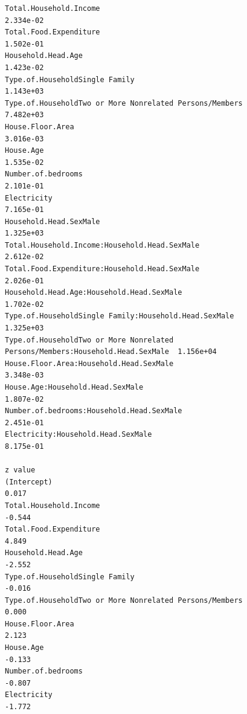 \documentclass[
]{article}
\begin{document}
\begin{verbatim}
Total.Household.Income                                                          2.334e-02
Total.Food.Expenditure                                                          1.502e-01
Household.Head.Age                                                              1.423e-02
Type.of.HouseholdSingle Family                                                  1.143e+03
Type.of.HouseholdTwo or More Nonrelated Persons/Members                         7.482e+03
House.Floor.Area                                                                3.016e-03
House.Age                                                                       1.535e-02
Number.of.bedrooms                                                              2.101e-01
Electricity                                                                     7.165e-01
Household.Head.SexMale                                                          1.325e+03
Total.Household.Income:Household.Head.SexMale                                   2.612e-02
Total.Food.Expenditure:Household.Head.SexMale                                   2.026e-01
Household.Head.Age:Household.Head.SexMale                                       1.702e-02
Type.of.HouseholdSingle Family:Household.Head.SexMale                           1.325e+03
Type.of.HouseholdTwo or More Nonrelated Persons/Members:Household.Head.SexMale  1.156e+04
House.Floor.Area:Household.Head.SexMale                                         3.348e-03
House.Age:Household.Head.SexMale                                                1.807e-02
Number.of.bedrooms:Household.Head.SexMale                                       2.451e-01
Electricity:Household.Head.SexMale                                              8.175e-01
                                                                               z value
(Intercept)                                                                      0.017
Total.Household.Income                                                          -0.544
Total.Food.Expenditure                                                           4.849
Household.Head.Age                                                              -2.552
Type.of.HouseholdSingle Family                                                  -0.016
Type.of.HouseholdTwo or More Nonrelated Persons/Members                          0.000
House.Floor.Area                                                                 2.123
House.Age                                                                       -0.133
Number.of.bedrooms                                                              -0.807
Electricity                                                                     -1.772

\end{verbatim}
\end{document}
